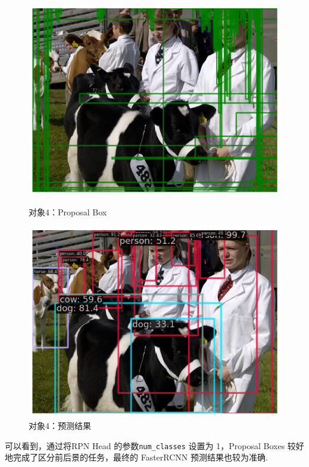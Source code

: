 \documentclass[notitlepage,cs4size,punct,oneside]{ctexrep}
\numberwithin{equation}{chapter}
\theoremstyle{mystyle}
\begin{document}
\begin{figure}[!htpb]
    \centering
    \begin{minipage}[t]{0.49\textwidth}
    \includegraphics[width=\linewidth]{4ppbox.png}
    \caption{对象4：Proposal Box}
    \label{mAPfrcnn}
    \end{minipage}
    \begin{minipage}[t]{0.49\textwidth}
    \includegraphics[width=\linewidth]{4result.png}
    \caption{对象4：预测结果}
    \label{frcnn_loss}
    \end{minipage}
\end{figure}

可以看到，通过将RPN Head 的参数\lstinline|num_classes| 设置为 1，Proposal Boxes 较好地完成了区分前后景的任务，最终的 FasterRCNN 预测结果也较为准确.
\end{document}
